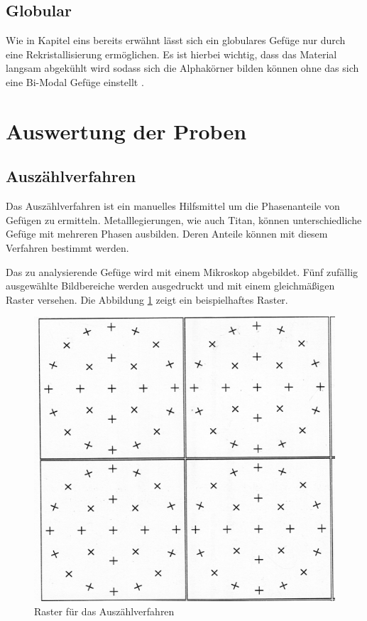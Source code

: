\documentclass[a4paper, 11pt]{tubsreprt}
\begin{document}
\subsection{Globular}
Wie in Kapitel eins bereits erwähnt lässt sich ein globulares Gefüge nur durch eine Rekristallisierung ermöglichen. Es ist hierbei wichtig, dass das Material langsam abgekühlt wird sodass sich die Alphakörner bilden können ohne das sich eine Bi-Modal Gefüge einstellt \cite{Luetjering2007}.

\section{Auswertung der Proben}
\subsection{Auszählverfahren}
Das Auszählverfahren ist ein manuelles Hilfsmittel um die Phasenanteile von Gefügen zu ermitteln. Metalllegierungen, wie auch Titan, können unterschiedliche Gefüge mit mehreren Phasen ausbilden. Deren Anteile können mit diesem Verfahren bestimmt werden.

Das zu analysierende Gefüge wird mit einem Mikroskop abgebildet. Fünf zufällig ausgewählte Bildbereiche werden ausgedruckt und mit einem gleichmäßigen Raster versehen. Die Abbildung \ref{Raster für das Auszählverfahren} zeigt ein beispielhaftes Raster.
\begin{figure} %
\centering
\includegraphics[scale=1]{Bilder/Raster.png}
\caption{Raster für das Auszählverfahren}
\label{Raster für das Auszählverfahren}
\end{figure}
\end{document}
